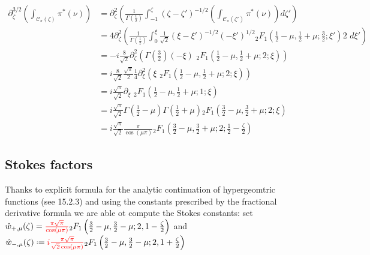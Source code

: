 \documentclass{article}
\begin{document}
\begin{align*}
\partial_{\zeta}^{3/2}\left(\int_{\mathcal{C}_\pi(\zeta)}\pi^*(\nu)\right)&=\partial_\zeta^2\left(\frac{1}{\Gamma\left(\frac{1}{2}\right)}\int_{-1}^\zeta(\zeta-\zeta')^{-1/2}\left(\int_{\mathcal{C}_\pi(\zeta')}\pi^*(\nu)\right)d\zeta'\right)\\
&=4\partial_\zeta^2\left(\frac{1}{\Gamma\left(\frac{1}{2}\right)}\int_0^\xi\frac{1}{\sqrt{2}}(\xi-\xi')^{-1/2}(-\xi')^{1/2} {}_2F_1\left(\frac{1}{2}-\mu,\frac{1}{2}+\mu;\frac{3}{2};\xi'\right) 2\,\,d\xi'\right)\\
&=-i\frac{8}{\sqrt{2}}\partial_\zeta^2\left(\Gamma\left(\tfrac{3}{2}\right)(-\xi) \,\,{}_2F_1\left(\frac{1}{2}-\mu,\frac{1}{2}+\mu;2;\xi\right)\right) \\
&=i\frac{8}{\sqrt{2}}\frac{\sqrt{\pi}}{2}\frac{1}{4}\partial_\xi^2\left(\xi\,\,{}_2F_1\left(\frac{1}{2}-\mu,\frac{1}{2}+\mu;2;\xi\right)\right)\\
&=i\frac{\sqrt{\pi}}{\sqrt{2}}\partial_{\xi}\,\, {}_2F_1\left(\frac{1}{2}-\mu,\frac{1}{2}+\mu;1;\xi\right)\\
&=i\frac{\sqrt{\pi}}{\sqrt{2}}\Gamma\left(\frac{1}{2}-\mu\right)\Gamma\left(\frac{1}{2}+\mu\right){}_2F_1\left(\frac{3}{2}-\mu,\frac{3}{2}+\mu;2;\xi\right)\\
&=i\frac{\sqrt{\pi}}{\sqrt{2}}\frac{\pi}{\cos(\mu \pi)}{}_2F_1\left(\frac{3}{2}-\mu,\frac{3}{2}+\mu;2;\frac{1}{2}-\frac{\zeta}{2}\right)
\end{align*}

\color{black}

\subsection{Stokes factors}

Thanks to explicit formula for the analytic continuation of hypergeomtric functions (see \cite{dlmf} 15.2.3) and using the constants prescribed by the fractional derivative formula we are able ot compute the Stokes constants: set $\hat{w}_{+,\mu}(\zeta)=\textcolor{red}{\frac{\pi\sqrt{\pi}}{\cos(\mu \pi)}} {}_2F_1\left(\tfrac{3}{2}-\mu,\tfrac{3}{2}-\mu;2,1-\tfrac{\zeta}{2}\right)$ and $\hat{w}_{-,\mu}(\zeta)\defeq \textcolor{red}{i\tfrac{\pi\sqrt{\pi}}{\sqrt{2}\cos(\mu \pi)}} {}_2F_1\left(\tfrac{3}{2}-\mu,\tfrac{3}{2}-\mu;2,1+\tfrac{\zeta}{2}\right)$
\end{document}
